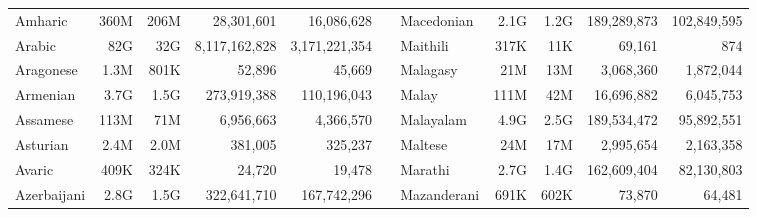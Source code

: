 \begin{table*}[t!]
{\begin{tabular}{@{}lrrrrclrrrr@{}}
            Amharic                   & 360M                     & 206M                      & 28,301,601               & 16,086,628                &                          & Macedonian                & 2.1G                     & 1.2G                      & 189,289,873              & 102,849,595               \\
            Arabic                    & 82G                      & 32G                       & 8,117,162,828            & 3,171,221,354             &                          & Maithili                  & 317K                     & 11K                       & 69,161                   & 874                       \\
            Aragonese                 & 1.3M                     & 801K                      & 52,896                   & 45,669                    &                          & Malagasy                  & 21M                      & 13M                       & 3,068,360                & 1,872,044                 \\
            Armenian                  & 3.7G                     & 1.5G                      & 273,919,388              & 110,196,043               &                          & Malay                     & 111M                     & 42M                       & 16,696,882               & 6,045,753                 \\
            Assamese                  & 113M                     & 71M                       & 6,956,663                & 4,366,570                 &                          & Malayalam                 & 4.9G                     & 2.5G                      & 189,534,472              & 95,892,551                \\
            Asturian                  & 2.4M                     & 2.0M                      & 381,005                  & 325,237                   &                          & Maltese                   & 24M                      & 17M                       & 2,995,654                & 2,163,358                 \\
            Avaric                    & 409K                     & 324K                      & 24,720                   & 19,478                    &                          & Marathi                   & 2.7G                     & 1.4G                      & 162,609,404              & 82,130,803                \\
            Azerbaijani               & 2.8G                     & 1.5G                      & 322,641,710              & 167,742,296               &                          & Mazanderani               & 691K                     & 602K                      & 73,870                   & 64,481                    \\

\end{tabular}}
\end{table*}
